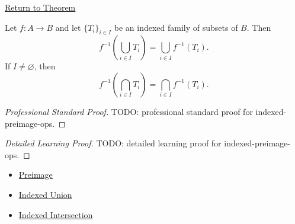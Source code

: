 \newpage
{}
\label{prf:indexed-preimage-ops}

\begin{remark*}[Return]
\hyperref[thm:indexed-preimage-ops]{Return to Theorem}
\end{remark*}

\begin{theorem*}
Let $f:A\to B$ and let $\{T_i\}_{i\in I}$ be an indexed family of subsets of
$B$. Then
\[
f^{-1}\!\left(\bigcup_{i\in I}T_i\right)
=
\bigcup_{i\in I}f^{-1}(T_i).
\]
If $I\neq\varnothing$, then
\[
f^{-1}\!\left(\bigcap_{i\in I}T_i\right)
=
\bigcap_{i\in I}f^{-1}(T_i).
\]
\end{theorem*}

\begin{proof}[Professional Standard Proof]
\LRAProofBodyStart
TODO: professional standard proof for indexed-preimage-ops.
\end{proof}

\begin{proof}[Detailed Learning Proof]
\LRAProofBodyStart
TODO: detailed learning proof for indexed-preimage-ops.
\end{proof}

\begin{remark*}

\end{remark*}

\begin{dependencies}
\begin{itemize}
  \item \hyperref[def:preimage]{Preimage}
  \item \hyperref[def:indexed-union]{Indexed Union}
  \item \hyperref[def:indexed-intersection]{Indexed Intersection}
\end{itemize}
\end{dependencies}

\clearpage
